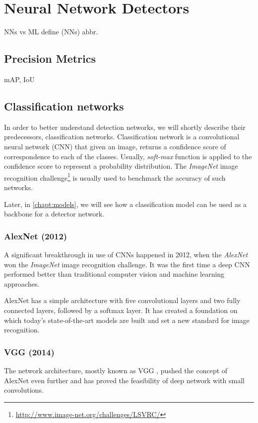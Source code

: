 \chapter{Neural Network Detectors}
NNs vs ML
define (NNs) abbr.

\section{Precision Metrics}
mAP, IoU

\section{Classification networks}
\label{chapt:cnets}
In order to better understand detection networks, we will shortly describe their predecessors, classification networks. Classification network is a convolutional neural network (CNN) \cite[ch.~9]{bib:dlbook} that given an image, returns a confidence score of correspondence to each of the classes. Usually, \textit{soft-max} function is applied to the confidence score to represent a probability distribution. The \textit{ImageNet} image recognition challenge\footnote{\url{http://www.image-net.org/challenges/LSVRC/}} is usually used to benchmark the accuracy of such networks.

Later, in \cref{chapt:models}, we will see how a classification model can be used as a backbone for a detector network.

\subsection*{AlexNet (2012)}
A significant breakthrough in use of CNNs happened in 2012, when the \textit{AlexNet} \cite{bib:alexnet} won the \textit{ImageNet} image recognition challenge. It was the first time a deep CNN performed better than traditional computer vision and machine learning approaches. 

AlexNet has a simple architecture with five convolutional layers and two fully connected layers, followed by a softmax layer. It has created a foundation on which today's state-of-the-art models are built and set a new standard for image recognition.

\subsection*{VGG (2014)}
\label{sec:VGG}
The network architecture, mostly known as VGG \cite{bib:vgg}, pushed the concept of AlexNet even further and has proved the feasibility of deep network with small convolutions. 

